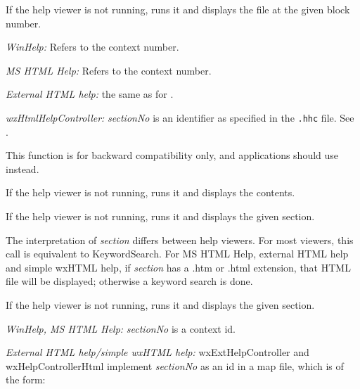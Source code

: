 \label{wxhelpcontrollerdisplayblock}


If the help viewer is not running, runs it and displays the file at the given block number.

{\it WinHelp:} Refers to the context number.

{\it MS HTML Help:} Refers to the context number.

{\it External HTML help:} the same as for .

{\it wxHtmlHelpController:} {\it sectionNo} is an identifier as specified in the {\tt .hhc} file. See .

This function is for backward compatibility only, and applications should use  instead.

\label{wxhelpcontrollerdisplaycontents}


If the help viewer is not running, runs it and displays the
contents.

\label{wxhelpcontrollerdisplaysection}


If the help viewer is not running, runs it and displays the given section.

The interpretation of {\it section} differs between help viewers. For most viewers,
this call is equivalent to KeywordSearch. For MS HTML Help, external HTML help
and simple wxHTML help, if {\it section} has a .htm
or .html extension, that HTML file will be displayed; otherwise
a keyword search is done.


If the help viewer is not running, runs it and displays the given section.

{\it WinHelp, MS HTML Help:} {\it sectionNo} is a context id.

{\it External HTML help/simple wxHTML help:} wxExtHelpController and wxHelpControllerHtml implement {\it sectionNo} as an id in a map file, which is of the form:


